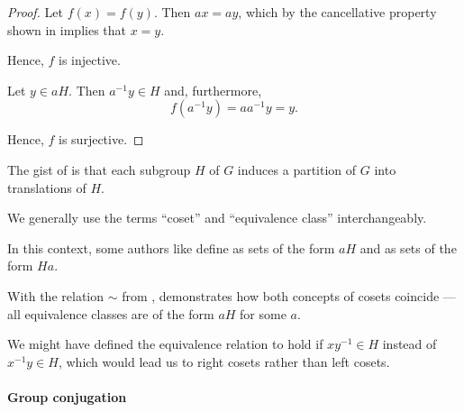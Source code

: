 \begin{proof}
   Let \( f(x) = f(y) \). Then \( a x = a y \), which by the cancellative property shown in  implies that \( x = y \).

  Hence, \( f \) is injective.

   Let \( y \in a H \). Then \( a^{-1} y \in H \) and, furthermore,
  \begin{equation*}
    f(a^{-1} y) = a a^{-1} y = y.
  \end{equation*}

  Hence, \( f \) is surjective.
\end{proof}

\begin{remark}\label{rem:subgroup_cosets}
  The gist of  is that each subgroup \( H \) of \( G \) induces a partition of \( G \) into translations of \( H \).

  We generally use the terms \enquote{coset} and \enquote{equivalence class} interchangeably.

  In this context, some authors like  define  as sets of the form \( a H \) and  as sets of the form \( H a \).

  With the relation \( {\sim} \) from ,  demonstrates how both concepts of cosets coincide --- all equivalence classes are of the form \( a H \) for some \( a \).

  We might have defined the equivalence relation to hold if \( x y^{-1} \in H \) instead of \( x^{-1} y \in H \), which would lead us to right cosets rather than left cosets.
\end{remark}

\paragraph{Group conjugation}

